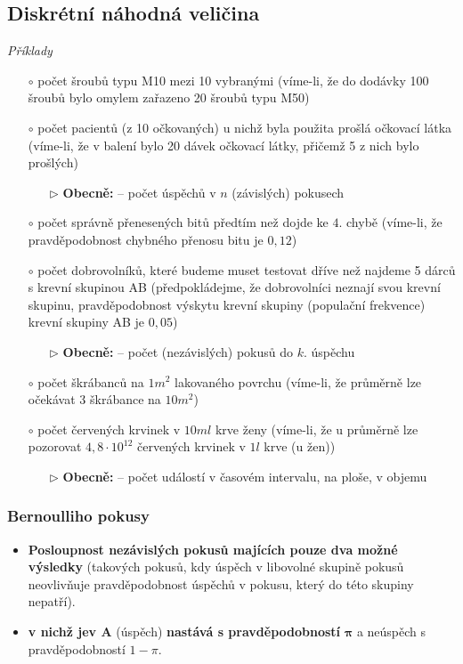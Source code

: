 \subsection{Diskrétní náhodná veličina}
\textit{Příklady}
\begin{itemize}
	\item[$\circ$] počet šroubů typu M10 mezi 10 vybranými (víme-li, že do dodávky 100 šroubů bylo omylem zařazeno 20 šroubů typu M50)
	\item[$\circ$] počet pacientů (z 10 očkovaných) u nichž byla použita prošlá očkovací látka (víme-li, že v balení bylo 20 dávek očkovací látky, přičemž 5 z nich bylo prošlých)

\begin{itemize}
	\item[$\rhd$] \textbf{Obecně:} -- počet úspěchů v $n$ (závislých) pokusech
	\end{itemize}
	\item[$\circ$] počet správně přenesených bitů předtím než dojde ke $4.$ chybě (víme-li, že pravděpodobnost chybného přenosu bitu je $0,12$)
	\item[$\circ$] počet dobrovolníků, které budeme muset testovat dříve než najdeme 5 dárců s krevní skupinou AB (předpokládejme, že dobrovolníci neznají svou krevní skupinu, pravděpodobnost výskytu krevní skupiny (populační frekvence) krevní skupiny AB je $0,05$)
\begin{itemize}
	\item[$\rhd$] \textbf{Obecně:} -- počet (nezávislých) pokusů do $k.$ úspěchu
	\end{itemize}
	\item[$\circ$] počet škrábanců na $1 m^2$ lakovaného povrchu (víme-li, že průměrně lze očekávat 3 škrábance na $10 m^2$)
	\item[$\circ$] počet červených krvinek v $10 ml$ krve ženy (víme-li, že u průměrně lze pozorovat $4,8 \cdot 10^{12}$ červených krvinek v $1l$ krve (u žen))
\begin{itemize}
	\item[$\rhd$] \textbf{Obecně:} -- počet událostí v časovém intervalu, na ploše, v objemu
	\end{itemize}
\end{itemize}
\subsubsection{Bernoulliho pokusy}
\begin{itemize}
	\item \textbf{Posloupnost nezávislých pokusů majících pouze dva možné výsledky} (takových pokusů, kdy úspěch v libovolné skupině pokusů neovlivňuje pravděpodobnost úspěchů v pokusu, který do této skupiny nepatří).
	\item \textbf{v nichž jev A} (úspěch) \textbf{nastává s pravděpodobností } $\mathbf{\pi}$ a neúspěch s pravděpodobností $1 - \pi$.
\end{itemize}

